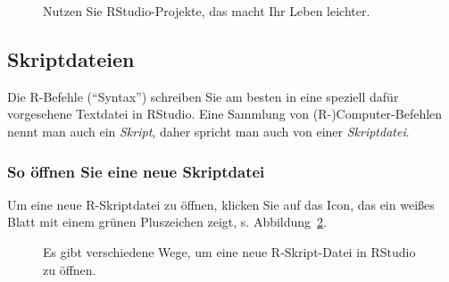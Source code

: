 \documentclass[
  a4paper,
  DIV=11]{scrreprt}
\theoremstyle{definition}
\theoremstyle{definition}
\theoremstyle{definition}
\theoremstyle{remark}
\begin{document}
\begin{figure}
\begin{minipage}{0.50\linewidth}
{}


\end{minipage}%

\caption{\label{fig-projects}Nutzen Sie RStudio-Projekte, das macht Ihr
Leben leichter.}

\end{figure}%

\subsection{Skriptdateien}\label{skriptdateien}

Die R-Befehle (``Syntax'') schreiben Sie am besten in eine speziell
dafür vorgesehene Textdatei in RStudio. Eine Sammlung von
(R-)Computer-Befehlen nennt man auch ein \emph{Skript}, daher spricht
man auch von einer \emph{Skriptdatei}.

\subsubsection{So öffnen Sie eine neue
Skriptdatei}\label{so-uxf6ffnen-sie-eine-neue-skriptdatei}

Um eine neue R-Skriptdatei zu öffnen, klicken Sie auf das Icon, das ein
weißes Blatt mit einem grünen Pluszeichen zeigt, s.
Abbildung~\ref{fig-script-new}.

\begin{figure}

\begin{minipage}{0.50\linewidth}



\end{minipage}%
%
\begin{minipage}{0.50\linewidth}
\end{minipage}%
\newline
\begin{minipage}{0.50\linewidth}
\end{minipage}%

\caption{\label{fig-script-new}Es gibt verschiedene Wege, um eine neue
R-Skript-Datei in RStudio zu öffnen.}

\end{figure}%
\end{document}
